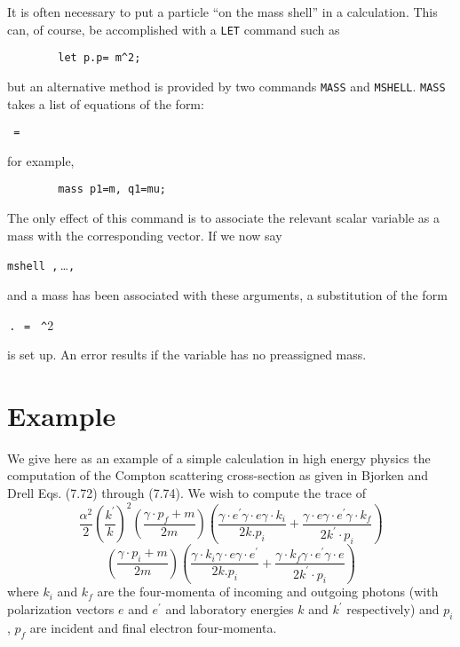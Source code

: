 It is often necessary to put a particle ``on the mass shell'' in a
calculation.  This can, of course, be accomplished with a \texttt{LET}
command such as
\begin{verbatim}
        let p.p= m^2;
\end{verbatim}
but an alternative method is provided by two commands \texttt{MASS} and
\texttt{MSHELL}.
\texttt{MASS} takes a list of equations of the form:
\begin{syntax}
  \texttt{ = }
\end{syntax}
for example,
\begin{verbatim}
        mass p1=m, q1=mu;
\end{verbatim}
The only effect of this command is to associate the relevant scalar
variable as a mass with the corresponding vector. If we now say
\begin{syntax}
  \texttt{mshell }\texttt{,}\,\dots\texttt{,}\,
\end{syntax}
and a mass has been associated with these arguments, a substitution of the
form
\begin{syntax}
  \,\texttt{.}\,\texttt{ = }%
    \texttt{\textasciicircum}2
\end{syntax}
is set up. An error results if the variable has no preassigned mass.

\section{Example}

We give here as an example of a simple calculation in high energy physics
the computation of the Compton scattering cross-section as given in
Bjorken and Drell Eqs. (7.72) through (7.74). We wish to compute the trace of
\[
\frac{\alpha^2}{2} \left(\frac{k^\prime}{k}\right)^2
 \left(\frac{\gamma\cdot p_f+m}{2m}\right)\left(\frac{\gamma\cdot e^\prime \gamma\cdot e
 \gamma\cdot k_i}{2k.p_i} + \frac{\gamma\cdot e\gamma\cdot e^\prime
 \gamma\cdot k_f}{2k^\prime\cdot p_i}\right)
\]
\[
 \left(\frac{\gamma\cdot p_i+m}{2m}\right)
 \left(\frac{\gamma\cdot k_i\gamma\cdot e\gamma\cdot e^\prime}{2k.p_i} +
 \frac{\gamma\cdot k_f\gamma\cdot e^\prime\gamma\cdot e}{2k^\prime\cdot p_i}
 \right)
\]
where $k_i$ and $k_f$ are the four-momenta of incoming and outgoing photons
(with polarization vectors $e$ and $e^\prime$ and laboratory energies 
$k$ and $k^\prime$
respectively) and $p_i$, $p_f$ are incident and final electron four-momenta.

